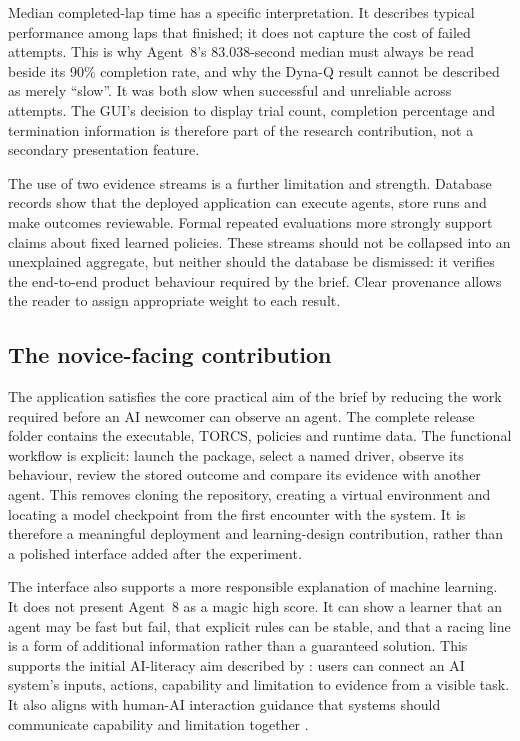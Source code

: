 Median completed-lap time has a specific interpretation. It describes typical performance among laps that finished; it does not capture the cost of failed attempts. This is why Agent~8's 83.038-second median must always be read beside its 90\% completion rate, and why the Dyna-Q result cannot be described as merely \enquote{slow}. It was both slow when successful and unreliable across attempts. The GUI's decision to display trial count, completion percentage and termination information is therefore part of the research contribution, not a secondary presentation feature.

The use of two evidence streams is a further limitation and strength. Database records show that the deployed application can execute agents, store runs and make outcomes reviewable. Formal repeated evaluations more strongly support claims about fixed learned policies. These streams should not be collapsed into an unexplained aggregate, but neither should the database be dismissed: it verifies the end-to-end product behaviour required by the brief. Clear provenance allows the reader to assign appropriate weight to each result.

\subsection{The novice-facing contribution}

The application satisfies the core practical aim of the brief by reducing the work required before an AI newcomer can observe an agent. The complete release folder contains the executable, TORCS, policies and runtime data. The functional workflow is explicit: launch the package, select a named driver, observe its behaviour, review the stored outcome and compare its evidence with another agent. This removes cloning the repository, creating a virtual environment and locating a model checkpoint from the first encounter with the system. It is therefore a meaningful deployment and learning-design contribution, rather than a polished interface added after the experiment.

The interface also supports a more responsible explanation of machine learning. It does not present Agent~8 as a magic high score. It can show a learner that an agent may be fast but fail, that explicit rules can be stable, and that a racing line is a form of additional information rather than a guaranteed solution. This supports the initial AI-literacy aim described by \textcite{long2020}: users can connect an AI system's inputs, actions, capability and limitation to evidence from a visible task. It also aligns with human-AI interaction guidance that systems should communicate capability and limitation together \parencite{amershi2019}.

